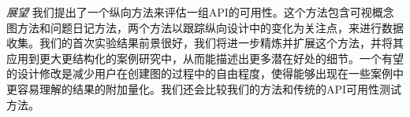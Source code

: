 \textit{展望}
我们提出了一个纵向方法来评估一组API的可用性。这个方法包含可视概念图方法和问题日记方法，两个方法以跟踪纵向设计中的变化为关注点，来进行数据收集。我们的首次实验结果前景很好，我们将进一步精炼并扩展这个方法，并将其应用到更大更结构化的案例研究中，从而能描述出更多潜在好处的细节。一个有望的设计修改是减少用户在创建图的过程中的自由程度，使得能够出现在一些案例中更容易理解的结果的附加量化。我们还会比较我们的方法和传统的API可用性测试方法。

\cleardoublepage



\cleardoublepage



